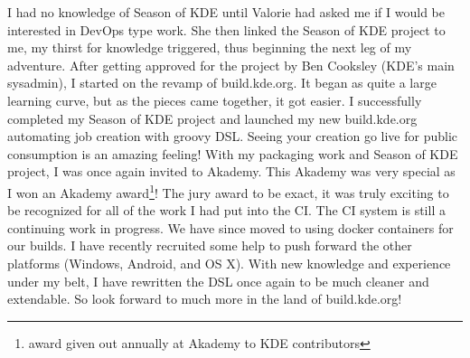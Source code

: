 I had no knowledge of Season of KDE until Valorie had asked me if I would be interested in DevOps type work. She then linked the Season of KDE project to me, my thirst for knowledge triggered, thus beginning the next leg of my adventure. After getting approved for the project by Ben Cooksley (KDE's main sysadmin), I started on the revamp of build.kde.org. It began as quite a large learning curve, but as the pieces came together, it got easier. I successfully completed my Season of KDE project and launched my new build.kde.org automating job creation with groovy DSL.  Seeing your creation go live for public consumption is an amazing feeling! With my packaging work and Season of KDE project, I was once again invited to Akademy. This Akademy was very special as I won an Akademy award\footnote{award given out annually at Akademy to KDE contributors}! The jury award to be exact, it was truly exciting to be recognized for all of the work I had put into the CI. The CI system is still a continuing work in progress. We have since moved to using docker containers for our builds. I have recently recruited some help to push forward the other platforms (Windows, Android, and OS X). With new knowledge and experience under my belt, I have rewritten the DSL once again to be much cleaner and extendable. So look forward to much more in the land of build.kde.org!
